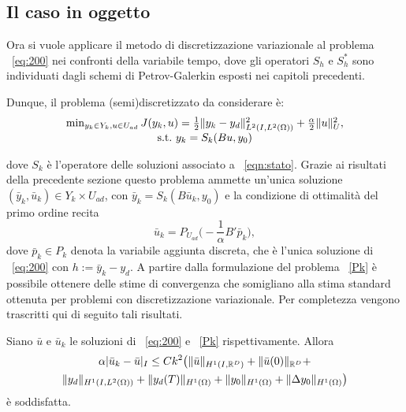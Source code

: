 \subsection{Il caso in oggetto}

Ora si vuole applicare il metodo di discretizzazione variazionale al problema ~\eqref{eq:200} nei confronti della variabile tempo, dove gli operatori $ S_h $ e $ S^*_h $ sono individuati dagli schemi di Petrov-Galerkin esposti nei capitoli precedenti.

Dunque, il problema (semi)discretizzato da considerare è:
\begin{equation}
\begin{array}{c}
	\min_{y_k\in Y_k, u\in U_{ad}} J(y_k,u)=\frac{1}{2}\lVert y_k-y_d\rVert^2_{L^2(I,L^2(\Omega))} + \frac{\alpha}{2}\lVert u\rVert^2_U, \\
	\text{s.t.} \ y_k=S_k(Bu,y_0) \\
\end{array}
\label{Pk}
\end{equation}

dove $ S_k $ è l'operatore delle soluzioni associato a ~\eqref{eqn:stato}. Grazie ai risultati della precedente sezione questo problema ammette un'unica soluzione $ (\bar{y}_k, \bar{u}_k)\in Y_k\times U_{ad} $, con $ \bar{y}_k=S_k(B\bar{u}_k,y_0) $ e la condizione di ottimalità del primo ordine recita
\begin{equation}
\label{cnott}
\bar{u}_k=P_{U_{ad}}\big( -\frac{1}{\alpha}B'\bar{p}_k\big),
\end{equation}
dove $ \bar{p}_k\in P_k $ denota la variabile aggiunta discreta, che è l'unica soluzione di ~\eqref{eq:200} con $ h:=\bar{y}_k-y_d $.
A partire dalla formulazione del problema ~\eqref{Pk} è possibile ottenere delle stime di convergenza che somigliano alla stima standard ottenuta per problemi con discretizzazione variazionale. Per completezza vengono trascritti qui di seguito tali risultati.
\begin{teorema}
\label{convu}

Siano $ \bar{u} $ e $ \bar{u}_k $ le soluzioni di ~\eqref{eq:200} e ~\eqref{Pk} rispettivamente. Allora
\begin{multline} 
\alpha \lvert \bar{u}_k-\bar{u}\rvert_I\le Ck^2\big( \lVert\bar{u}\rVert_{H^1(I,\mathbb{R}^D)} + \lVert\bar{u}(0)\rVert_{\mathbb{R}^D} + \\
\lVert y_d\rVert_{H^1(I,L^2(\Omega))} + \lVert y_d(T)\rVert_{H^1(\Omega)} + \lVert y_0\rVert_{H^1(\Omega)} + \lVert\Delta y_0\rVert_{H^1(\Omega)}\big)
\end{multline}
è soddisfatta.

\end{teorema}

